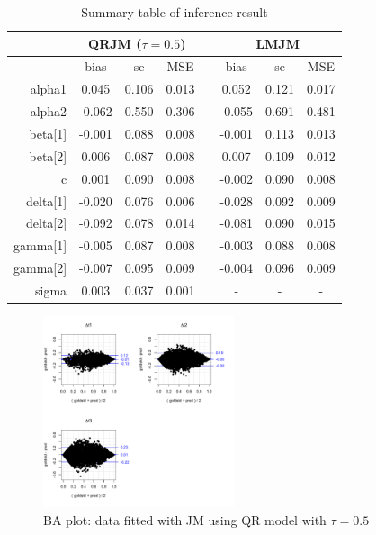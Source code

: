 \documentclass{article}
\begin{document}
\begin{table}[H]
\centering
\caption{Summary table of inference result}
\begin{tabular}{rccccccc}
\hline
& \multicolumn{3}{c}{QRJM ($\tau=0.5$)} & & \multicolumn{3}{c}{LMJM}\\
\hline
 & bias & se & MSE & & bias & se & MSE \\
 \cline{2-4}  \cline{6-8}
alpha1 & 0.045 & 0.106 & 0.013 & & 0.052 & 0.121 & 0.017 \\
  alpha2 & -0.062 & 0.550 & 0.306 & & -0.055 & 0.691 & 0.481 \\
  beta[1] & -0.001 & 0.088 & 0.008 & & -0.001 & 0.113 & 0.013 \\
  beta[2] & 0.006 & 0.087 & 0.008 & & 0.007 & 0.109 & 0.012 \\
  c & 0.001 & 0.090 & 0.008 & & -0.002 & 0.090 & 0.008 \\
  delta[1] & -0.020 & 0.076 & 0.006 & & -0.028 & 0.092 & 0.009 \\
  delta[2] & -0.092 & 0.078 & 0.014 & & -0.081 & 0.090 & 0.015 \\
  gamma[1] & -0.005 & 0.087 & 0.008 & & -0.003 & 0.088 & 0.008 \\
  gamma[2] & -0.007 & 0.095 & 0.009 & & -0.004 & 0.096 & 0.009 \\
  sigma & 0.003 & 0.037 & 0.001 & & - & - & - \\
   \hline
\end{tabular}
\end{table}



\begin{figure}[H]
\centering
\includegraphics[width=0.5\textwidth]{ba_qt50data_medianfit.pdf}
\caption{BA plot: data fitted with JM using QR model with $\tau=0.5$}
\end{figure}
\end{document}
